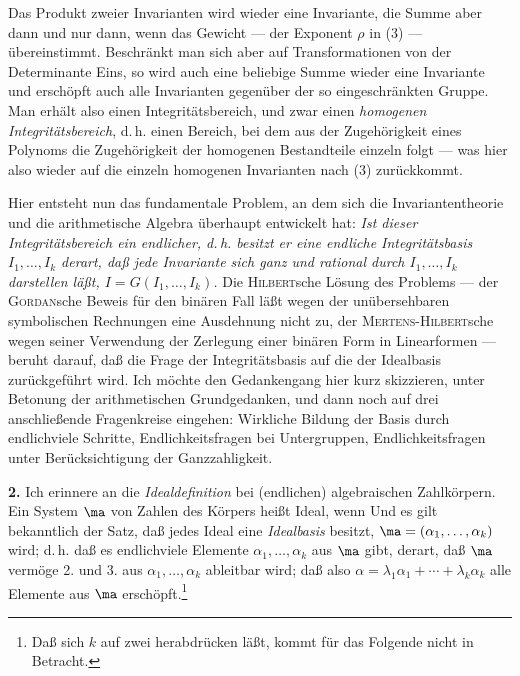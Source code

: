 Das Produkt zweier Invarianten wird wieder eine Invariante, die Summe aber dann und nur dann, wenn das Gewicht --- der Exponent $\rho$ in (3) --- übereinstimmt. Beschränkt man sich aber auf Transformationen von der Determinante Eins, so wird auch eine beliebige Summe wieder eine Invariante und erschöpft auch alle Invarianten gegenüber der so eingeschränkten Gruppe. Man erhält also einen Integritätsbereich, und zwar einen \emph{homogenen Integritätsbereich}, d.\,h. einen Bereich, bei dem aus der Zugehörigkeit eines Polynoms die Zugehörigkeit der homogenen Bestandteile einzeln folgt --- was hier also wieder auf die einzeln homogenen Invarianten nach (3) zurückkommt.

Hier entsteht nun das fundamentale Problem, an dem sich die Invariantentheorie und die arithmetische Algebra überhaupt entwickelt hat: \emph{Ist dieser Integritätsbereich ein endlicher, d.\,h. besitzt er eine endliche Integritätsbasis $I_1,\ldots,I_k$ derart, daß jede Invariante sich ganz und rational durch $I_1,\ldots,I_k$ darstellen läßt, $I=G(I_1,\ldots,I_k)$.} Die \textsc{Hilbert}sche Lösung des Problems --- der \textsc{Gordan}sche Beweis für den binären Fall läßt wegen der unübersehbaren symbolischen Rechnungen eine Ausdehnung nicht zu, der \textsc{Mertens-Hilbert}sche wegen seiner Verwendung der Zerlegung einer binären Form in Linearformen --- beruht darauf, daß die Frage der Integritätsbasis auf die der Idealbasis zurückgeführt wird. Ich möchte den Gedankengang hier kurz skizzieren, unter Betonung der arithmetischen Grundgedanken, und dann noch auf drei anschließende Fragenkreise eingehen: Wirkliche Bildung der Basis durch endlichviele Schritte, Endlichkeitsfragen bei Untergruppen, Endlichkeitsfragen unter Berücksichtigung der Ganzzahligkeit.

\textbf{2.} Ich erinnere an die \emph{Idealdefinition} bei (endlichen) algebraischen Zahlkörpern. Ein System $\ma$ von Zahlen des Körpers heißt Ideal, wenn
Und es gilt bekanntlich der Satz, daß jedes Ideal eine \emph{Idealbasis} besitzt, $\ma=(\alpha_1,\ldots,\alpha_k)$ wird; d.\,h. daß es endlichviele Elemente $\alpha_1,\ldots,\alpha_k$ aus $\ma$ gibt, derart, daß $\ma$ vermöge 2. und 3. aus $\alpha_1,\ldots,\alpha_k$ ableitbar wird; daß also $\alpha=\lambda_1\alpha_1+\cdots+\lambda_k\alpha_k$ alle Elemente aus $\ma$ erschöpft.\footnote{Daß sich $k$ auf zwei herabdrücken läßt, kommt für das Folgende nicht in Betracht.}

